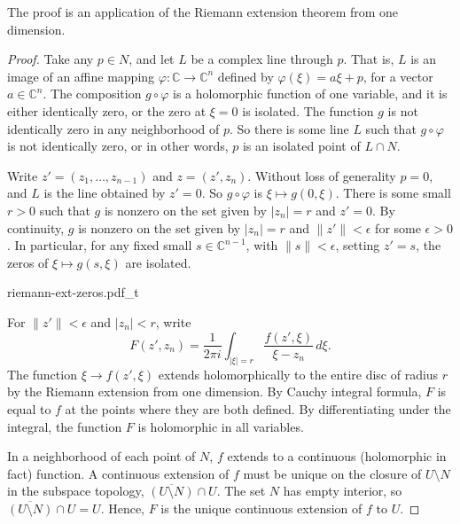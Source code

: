\documentclass[12pt,openany]{book}
\newcommand{\sabs}[1]{\lvert {#1} \rvert}
\newcommand{\snorm}[1]{\lVert {#1} \rVert}
\newcommand{\abs}[1]{\left\lvert {#1} \right\rvert}
\newcommand{\C}{{\mathbb{C}}}
\theoremstyle{plain}
\theoremstyle{remark}
\theoremstyle{definition}
\newenvironment{myfig}{%
    \begin{center}
}{%
    \end{center}
}
\theoremstyle{exercise}
\theoremstyle{example}
\newcommand{\exerciseref}[1]{\hyperref[#1]{Exercise~\ref*{#1}}}
\begin{document}
The proof is an application of the Riemann extension theorem from one dimension.

\begin{proof}
Take any $p \in N$, and let $L$ be a complex line through $p$.
That is,
$L$ is an image of an affine mapping
$\varphi \colon \C \to \C^n$ defined by
$\varphi(\xi) = a\xi + p$, for a vector $a \in \C^n$.
The composition $g \circ \varphi$
is a holomorphic function of one variable, and it
is either identically zero, or
the zero at $\xi=0$ is isolated.
The function $g$ is not identically zero in any neighborhood of $p$.
So there is some line $L$ such that $g \circ \varphi$
is not identically zero, or in other words, $p$
is an isolated point of $L \cap N$.

Write $z' =
(z_1,\ldots,z_{n-1})$ and $z=(z',z_n)$.
Without loss of generality $p = 0$, and $L$ is the line
obtained by $z' = 0$.
So $g \circ \varphi$ is $\xi \mapsto g(0,\xi)$.
There is some small
$r > 0$ such that $g$ is nonzero on the set
given by $\sabs{z_n} = r$ and $z' = 0$.
By continuity,
$g$ is nonzero on the set given by
$\sabs{z_n} = r$ and $\snorm{z'} <\epsilon$ for some $\epsilon >0$.
In particular, for any fixed small $s \in \C^{n-1}$, with $\snorm{s} < \epsilon$,
setting $z' = s$,
the zeros of $\xi \mapsto g(s,\xi)$ are isolated.

\begin{myfig}
{riemann-ext-zeros.pdf_t}
\end{myfig}

For $\snorm{z'} <
\epsilon$ and $\abs{z_n} < r$, write
\begin{equation*}
F(z',z_n) =
\frac{1}{2\pi i}
\int_{\sabs{\xi}=r} \frac{f(z',\xi)}{\xi-z_n} \,d\xi .
\end{equation*}
The function $\xi \to f(z',\xi)$ extends holomorphically to the entire
disc of radius $r$ by the Riemann extension from one dimension.  By Cauchy
integral formula,
$F$ is equal to $f$ at the points where they are both defined.
By differentiating under the integral, the function $F$ is holomorphic
in all variables.

In a neighborhood of each point of 
$N$, $f$ extends to a continuous (holomorphic in fact) function.
A continuous extension of $f$ must be unique
on the closure of
$U \setminus N$ in the subspace topology,
$\overline{(U \setminus N)} \cap U$.  The set $N$ has empty interior,
so $\overline{(U \setminus N)} \cap U = U$.  Hence, $F$ is the unique
continuous extension of $f$ to $U$.
\end{proof}
\end{document}
